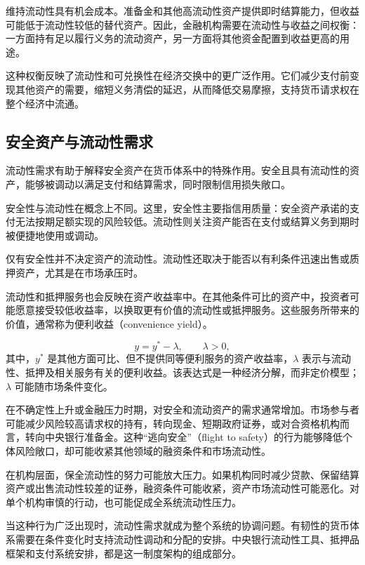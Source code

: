 维持流动性具有机会成本。准备金和其他高流动性资产提供即时结算能力，但收益可能低于流动性较低的替代资产。因此，金融机构需要在流动性与收益之间权衡：一方面持有足以履行义务的流动资产，另一方面将其他资金配置到收益更高的用途。

这种权衡反映了流动性和可兑换性在经济交换中的更广泛作用。它们减少支付前变现其他资产的需要，缩短义务清偿的延迟，从而降低交易摩擦，支持货币请求权在整个经济中流通。

\subsection{安全资产与流动性需求}

流动性需求有助于解释安全资产在货币体系中的特殊作用。安全且具有流动性的资产，能够被调动以满足支付和结算需求，同时限制信用损失敞口。

安全性与流动性在概念上不同。这里，安全性主要指信用质量：安全资产承诺的支付无法按期足额实现的风险较低。流动性则关注资产能否在支付或结算义务到期时被便捷地使用或调动。

仅有安全性并不决定资产的流动性。流动性还取决于能否以有利条件迅速出售或质押资产，尤其是在市场承压时。

流动性和抵押服务也会反映在资产收益率中。在其他条件可比的资产中，投资者可能愿意接受较低收益率，以换取更有价值的流动性或抵押服务。这些服务所带来的价值，通常称为便利收益（convenience yield）。

\begin{equation}
y
=
y^{*}-\lambda,
\qquad \lambda>0,
\label{eq:ch2-convenience-yield}
\end{equation}
其中，$y^{*}$ 是其他方面可比、但不提供同等便利服务的资产收益率，$\lambda$ 表示与流动性、抵押及相关服务有关的便利收益。该表达式是一种经济分解，而非定价模型；$\lambda$ 可能随市场条件变化。

在不确定性上升或金融压力时期，对安全和流动资产的需求通常增加。市场参与者可能减少风险较高请求权的持有，转向现金、短期政府证券，或对合资格机构而言，转向中央银行准备金。这种“逃向安全”（flight to safety）的行为能够降低个体风险敞口，却可能收紧其他领域的融资条件和市场流动性。

在机构层面，保全流动性的努力可能放大压力。如果机构同时减少贷款、保留结算资产或出售流动性较差的证券，融资条件可能收紧，资产市场流动性可能恶化。对单个机构审慎的行动，也可能促成全系统流动性压力。

当这种行为广泛出现时，流动性需求就成为整个系统的协调问题。有韧性的货币体系需要在条件变化时支持流动性调动和分配的安排。中央银行流动性工具、抵押品框架和支付系统安排，都是这一制度架构的组成部分。


